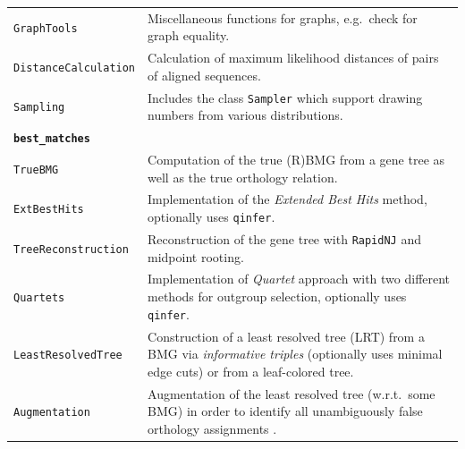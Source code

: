 \documentclass[hidelinks,11pt]{article}
\begin{document}
{\begin{longtable}{| p{4.0cm} | p{10cm} |}
	\texttt{GraphTools} &
	Miscellaneous functions for graphs, e.g.\ check for graph equality. \\
	\texttt{DistanceCalculation} &
	Calculation of maximum likelihood distances of pairs of aligned sequences. \\
  \texttt{Sampling} &
  Includes the class \texttt{Sampler} which support drawing numbers from 
  various distributions. \\
	\hline
	\multicolumn{2}{|l|}{\textbf{\texttt{best\_matches}}}\\
	\hline
	\texttt{TrueBMG} &
	Computation of the true (R)BMG from a gene tree as well as the true orthology relation. \\
	\texttt{ExtBestHits} &
	Implementation of the \emph{Extended Best Hits} method, optionally uses \texttt{qinfer}. \\
	\texttt{TreeReconstruction} &
	Reconstruction of the gene tree with \texttt{RapidNJ} \citep{simonsen2008} and midpoint rooting. \\
	\texttt{Quartets} &
	Implementation of \emph{Quartet} approach with two different methods for outgroup selection, optionally uses \texttt{qinfer}. \\
	\texttt{LeastResolvedTree} &
	Construction of a least resolved tree (LRT) from a BMG via \emph{informative triples} (optionally uses minimal edge cuts) or from a leaf-colored tree. \\
	\texttt{Augmentation} &
	Augmentation of the least resolved tree (w.r.t.\ some BMG) in order to identify all unambiguously false orthology assignments \citep{schaller2020}. \\

\end{longtable}}
\end{document}
